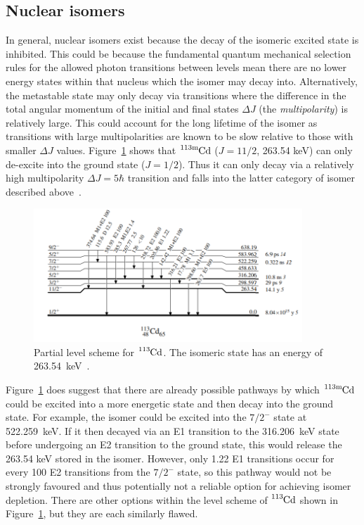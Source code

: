 \documentclass[12pt,a4paper]{article}
\newcommand{\cdm}{\ce{^{113\text{m}}Cd}}
\begin{document}

\subsection*{Nuclear isomers}
In general, nuclear isomers exist because the decay of the isomeric excited state is inhibited.
This could be because the fundamental quantum mechanical selection rules for the allowed photon transitions between levels mean there are no lower energy states within that nucleus which the isomer may decay into.
Alternatively, the metastable state may only decay via transitions where the difference in the total angular momentum of the initial and final states $\Delta J$ (the \textit{multipolarity}) is relatively large.
This could account for the long lifetime of the isomer as transitions with large multipolarities are known to be slow relative to those with smaller $\Delta J$ values. 
Figure~\ref{fig:cd113} shows that $\cdm$ ($J = 11/2$, 263.54 keV) can only de-excite into the ground state ($J = 1/2$).
Thus it can only decay via a relatively high multipolarity $\Delta J = 5\hbar$ transition and falls into the latter category of isomer described above~\cite{blachot_notitle_111}.
\begin{figure}[htbp]
	\centering
	\includegraphics[width=0.9\textwidth]{113cd_partial_level_scheme_ENSDF.png}
	\caption{Partial level scheme for $\ce{^{113}Cd}$. The isomeric state has an energy of 263.54~keV~\cite{blachot_notitle_111}.}
\label{fig:cd113}
\end{figure}

\medskip
\noindent
Figure~\ref{fig:cd113} does suggest that there are already possible pathways by which $\cdm$ could be excited into a more energetic state and then decay into the ground state.
For example, the isomer could be excited into the $7/2^-$ state at 522.259~keV.
If it then decayed via an E1 transition to the 316.206~keV state before undergoing an E2 transition to the ground state, this would release the 263.54 keV stored in the isomer.
However, only 1.22 E1 transitions occur for every 100 E2 transitions from the $7/2^-$ state, so this pathway would not be strongly favoured and thus potentially not a reliable option for achieving isomer depletion. %
There are other options within the level scheme of $\ce{^{113}Cd}$ shown in Figure~\ref{fig:cd113}, but they are each similarly flawed.
\end{document}
